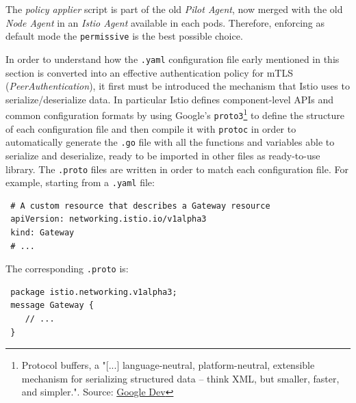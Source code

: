 The \textit{policy applier} script is part of the old \textit{Pilot Agent}, now merged with the old \textit{Node Agent} in an \textit{Istio Agent} available in each pods. Therefore, enforcing as default mode the \texttt{permissive} is the best possible choice.

In order to understand how the \texttt{.yaml} configuration file early mentioned in this section is converted into an effective authentication policy for mTLS (\textit{PeerAuthentication}), it first must be introduced the mechanism that Istio uses to serialize/deserialize data. In particular Istio defines component-level APIs and common configuration formats by using Google's \texttt{proto3}\footnote{Protocol buffers, a "[...] language-neutral, platform-neutral, extensible mechanism for serializing structured data – think XML, but smaller, faster, and simpler.". Source: \href{https://developers.google.com/protocol-buffers}{Google Dev}} to define the structure of each configuration file and then compile it with \texttt{protoc} in order to automatically generate the \texttt{.go} file with all the functions and variables able to serialize and deserialize, ready to be imported in other files as ready-to-use library. The \texttt{.proto} files are written in order to match each configuration file. For example, starting from a \texttt{.yaml} file:

\begin{lstlisting}
 # A custom resource that describes a Gateway resource
 apiVersion: networking.istio.io/v1alpha3
 kind: Gateway
 # ...
\end{lstlisting}

\noindent The corresponding \texttt{.proto} is:

\begin{lstlisting}
 package istio.networking.v1alpha3;
 message Gateway {
    // ...
 }
\end{lstlisting}
